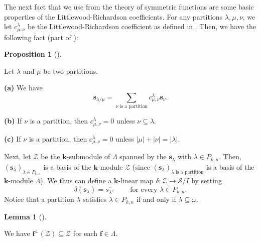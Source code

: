 \documentclass[numbers=enddot,12pt,final,onecolumn,notitlepage]{scrartcl}%
\theoremstyle{definition}
\newtheorem{lem}[theo]{Lemma}
\newenvironment{lemma}[1][]
{\begin{lem}[#1]\begin{leftbar}}
{\end{leftbar}\end{lem}}
\newtheorem{prop}[theo]{Proposition}
\newenvironment{proposition}[1][]
{\begin{prop}[#1]\begin{leftbar}}
{\end{leftbar}\end{prop}}
\let\sumnonlimits\sum
\renewcommand{\sum}{\sumnonlimits\limits}
\begin{document}
The next fact that we use from the theory of symmetric functions are some
basic properties of the Littlewood-Richardson coefficients. For any partitions
$\lambda,\mu,\nu$, we let $c_{\mu,\nu}^{\lambda}$ be the Littlewood-Richardson
coefficient as defined in \cite[Definition 2.5.8]{GriRei18}. Then, we have the
following fact (part of \cite[Remark 2.5.9]{GriRei18}):

\begin{proposition}
\label{prop.LR.props}Let $\lambda$ and $\mu$ be two partitions.

\textbf{(a)} We have
\[
\mathbf{s}_{\lambda/\mu}=\sum_{\nu\text{ is a partition}}c_{\mu,\nu}^{\lambda
}\mathbf{s}_{\nu}.
\]


\textbf{(b)} If $\nu$ is a partition, then $c_{\mu,\nu}^{\lambda}=0$ unless
$\nu\subseteq\lambda$.

\textbf{(c)} If $\nu$ is a partition, then $c_{\mu,\nu}^{\lambda}=0$ unless
$\left\vert \mu\right\vert +\left\vert \nu\right\vert =\left\vert
\lambda\right\vert $.
\end{proposition}

Next, let $\mathcal{Z}$ be the $\mathbf{k}$-submodule of $\Lambda$ spanned by
the $\mathbf{s}_{\lambda}$ with $\lambda\in P_{k,n}$. Then, $\left(
\mathbf{s}_{\lambda}\right)  _{\lambda\in P_{k,n}}$ is a basis of the
$\mathbf{k}$-module $\mathcal{Z}$ (since $\left(  \mathbf{s}_{\lambda}\right)
_{\lambda\text{ is a partition}}$ is a basis of the $\mathbf{k}$-module
$\Lambda$). We thus can define a $\mathbf{k}$-linear map $\delta
:\mathcal{Z}\rightarrow\mathcal{S}/I$ by setting%
\[
\delta\left(  \mathbf{s}_{\lambda}\right)  =\overline{s_{\lambda^{\vee}}%
}\ \ \ \ \ \ \ \ \ \ \text{for every }\lambda\in P_{k,n}.
\]
Notice that a partition $\lambda$ satisfies $\lambda\in P_{k,n}$ if and only
if $\lambda\subseteq\omega$.

\begin{lemma}
\label{lem.coeffw.Z-invar-skew}We have $\mathbf{f}^{\perp}\left(
\mathcal{Z}\right)  \subseteq\mathcal{Z}$ for each $\mathbf{f}\in\Lambda$.
\end{lemma}
\end{document}
